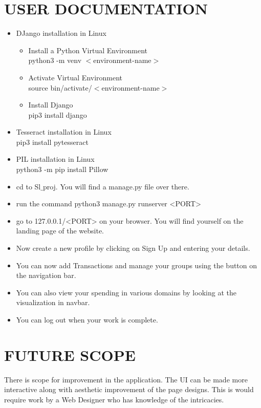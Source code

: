 \documentclass[12pt]{article}
\begin{document}
\section{USER DOCUMENTATION}
\begin{itemize}
    \item DJango installation in Linux
    \begin{itemize}
        \item Install a Python Virtual Environment\\
		python3 -m venv $<$environment-name$>$
        \item Activate Virtual Environment\\
		source bin/activate/$<$environment-name$>$
        \item Install Django\\
		pip3 install django
    \end{itemize}
    \item Tesseract installation in Linux \\
    	pip3 install pytesseract
    \item PIL installation in Linux \\
	python3 -m pip install Pillow
	
	\item cd to Sl$\_$proj. You will find a manage.py file over there.
\item run the command 
    python3 manage.py runserver <PORT>
\item go to 127.0.0.1/<PORT> on your browser. You will find yourself on the landing page of the website.
\item Now create a new profile by clicking on Sign Up and entering your details.
\item You can now add Transactions and manage your groups using the button on the navigation bar.
\item You can also view your spending in various domains by looking at the visualization in navbar.
\item You can log out when your work is complete.

\end{itemize}

\pagebreak

\section{FUTURE SCOPE}
There is scope for improvement in the application. The UI can be made more interactive along with aesthetic improvement of the page designs. This is would require work by a Web Designer who has knowledge of the intricacies.
\end{document}
